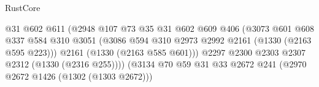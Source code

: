 \begin{lexlean}{RustCore}
\begin{coremodule}
                                                      @31
                                                      @602
                                                      @611
                                                      (@2948
                                                        @107
                                                        @73
                                                        @35
                                                        @31
                                                        @602
                                                        @609
                                                        @406
                                                        (@3073
                                                          @601
                                                          @608
                                                          @337
                                                          @584
                                                          @310
                                                          @3051
                                                          (@3086
                                                            @594
                                                            @310
                                                            @2973
                                                            @2992
                                                            @2161
                                                            (@1330 (@2163 @595 @223)))
                                                          @2161
                                                          (@1330 (@2163 @585 @601)))
                                                        @2297
                                                        @2300
                                                        @2303
                                                        @2307
                                                        @2312
                                                        (@1330 (@2316 @255))))
                                                    (@3134
                                                      @70
                                                      @59
                                                      @31
                                                      @33
                                                      @2672
                                                      @241
                                                      (@2970 @2672 @1426 (@1302 (@1303 @2672)))

\end{coremodule}
\end{lexlean}
